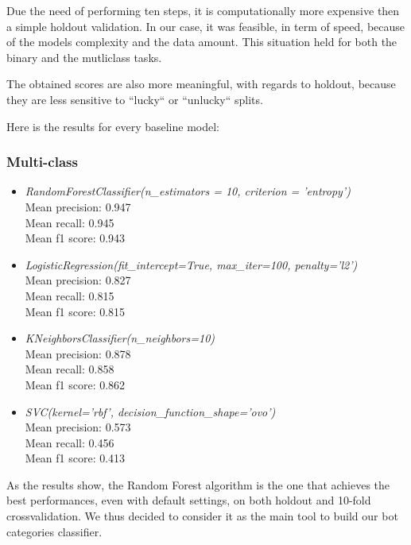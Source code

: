 Due the need of performing ten steps, it is computationally more expensive then a simple holdout validation. In our case, it was feasible, in term of speed, because of the models complexity and the data amount. This situation held for both the binary and the mutliclass tasks.

The obtained scores are also more meaningful, with regards to holdout, because they are less sensitive to ``lucky`` or ``unlucky`` splits.

Here is the results for every baseline model:
\subsubsection{Multi-class}
\begin{itemize}
	\item[\PencilRight] \textit{RandomForestClassifier(n\_estimators = 10, criterion = 'entropy')}\\
	Mean precision: 0.947\\
	Mean recall: 0.945\\
	Mean f1 score: 0.943
	\item[\PencilRight]\textit{LogisticRegression(fit\_intercept=True, max\_iter=100, penalty='l2')}\\
	Mean precision: 0.827\\
	Mean recall: 0.815\\
	Mean f1 score: 0.815
	\item[\PencilRight]\textit{KNeighborsClassifier(n\_neighbors=10)}\\
	Mean precision: 0.878\\
	Mean recall: 0.858\\
	Mean f1 score: 0.862
	\item[\PencilRight]\textit{SVC(kernel='rbf', decision\_function\_shape='ovo')}\\
	Mean precision: 0.573\\
	Mean recall: 0.456\\
	Mean f1 score: 0.413
\end{itemize}

As the results show, the Random Forest algorithm is the one that achieves the best performances, even with default settings, on both holdout and 10-fold crossvalidation. We thus decided to consider it as the main tool to build our bot categories classifier. 
